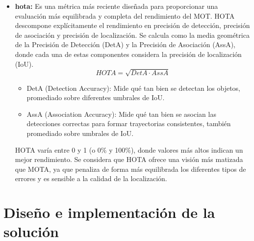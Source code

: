 \documentclass[11pt,spanish,listoffigures,listoftables]{tfgetsinf}
\begin{document}
\begin{itemize}
   \item \textbf{\gls{hota}:} Es una métrica más reciente diseñada para proporcionar una evaluación más equilibrada y completa del rendimiento del MOT. HOTA descompone explícitamente el rendimiento en precisión de detección, precisión de asociación y precisión de localización. Se calcula como la media geométrica de la Precisión de Detección (DetA) y la Precisión de Asociación (AssA), donde cada una de estas componentes considera la precisión de localización (IoU).
   \begin{equation}
   HOTA = \sqrt{DetA \cdot AssA}
   \end{equation}
   \begin{itemize}
     \item DetA (Detection Accuracy): Mide qué tan bien se detectan los objetos, promediado sobre diferentes umbrales de IoU.
     \item AssA (Association Accuracy): Mide qué tan bien se asocian las detecciones correctas para formar trayectorias consistentes, también promediado sobre umbrales de IoU.
   \end{itemize}
   HOTA varía entre 0 y 1 (o 0\% y 100\%), donde valores más altos indican un mejor rendimiento. Se considera que HOTA ofrece una visión más matizada que MOTA, ya que penaliza de forma más equilibrada los diferentes tipos de errores y es sensible a la calidad de la localización.


\end{itemize}





\chapter{Diseño e implementación de la solución}\label{chap:diseno_e_implementacion}
\end{document}

